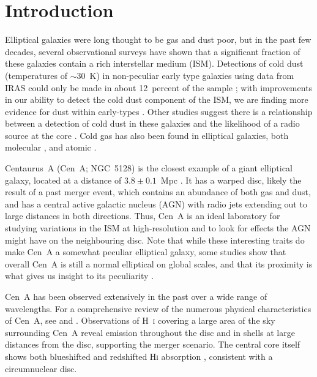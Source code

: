 \section{Introduction} \label{intro2}
Elliptical galaxies were long thought to be gas and dust poor, but in
the past few decades, several observational surveys 
have shown that a significant fraction of these galaxies contain a rich interstellar
medium (ISM).  Detections of cold dust (temperatures of $\sim 30$~K) in non-peculiar early type galaxies using data from IRAS could only be made in about 12~percent of the sample \citep[e.g.][]{1998ApJ...499..670B}; with improvements in our ability to detect the cold dust component of the ISM, we are finding more evidence for dust within early-types \citep[e.g.][]{2004ApJS..151..237T, 2004A&A...416...41X,2008ApJ...677..249L, 2009AJ....137.3053Y, Smith_2012_in_press}.  Other studies suggest there is a relationship between a detection of cold
dust in these galaxies and the likelihood of a radio source at the core \citep[e.g.][]{1989ApJ...337..209W}.  Cold gas has also been found in elliptical galaxies, both molecular \citep[i.e.][]{1989ApJ...344..747T, 1995A&A...297..643W, 2003ApJ...584..260W, 2011MNRAS.414..940Y}, and atomic \citep[e.g.][]{1985AJ.....90..454K, 1992ApJ...387..484B, 1994A&A...286..389H, 1995A&A...300..675H, 1999ASPC..163...84M, 2006MNRAS.371..157M, 2010ApJ...725..100W}.

Centaurus~A (Cen~A; NGC~5128) is the closest example of a giant elliptical galaxy, located at a distance of $3.8 \pm 0.1$~Mpc \citep{2010PASA...27..457H}. It has a warped disc, likely the result of a past merger event, which contains an abundance of both gas and dust, and has a central active galactic nucleus (AGN) with radio jets extending out to large distances in both directions.  Thus, Cen~A is an ideal laboratory for studying variations in the ISM at high-resolution and to look for effects the AGN might have on the neighbouring disc.  Note that while these interesting traits do make Cen~A a somewhat peculiar elliptical galaxy, some studies show that overall Cen~A is still a normal elliptical on global scales, and that its proximity is what gives us insight to its peculiarity \citep[e.g.][]{2010PASA...27..475H}.

Cen~A has been observed extensively in the past over a wide range of wavelengths.  For a comprehensive review of the numerous physical characteristics of Cen~A, see \citet{1998A&ARv...8..237I} and \citet{2010PASA...27..463M}.  Observations of H~\textsc{i} covering a large area of the sky surrounding Cen~A \citep[e.g][]{1990AJ.....99.1781V,1994ApJ...423L.101S,2008A&A...485L...5M,2010A&A...515A..67S} reveal emission throughout the disc and in shells at large distances from the disc, supporting the merger scenario.  The central core itself shows both blueshifted and redshifted H\textsc{i} absorption \citep{2008A&A...485L...5M,2010A&A...515A..67S}, consistent with a circumnuclear disc.

